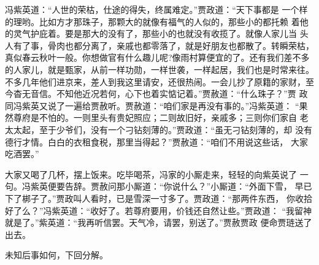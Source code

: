 冯紫英道：“人世的荣枯，仕途的得失，终属难定。”贾政道：“天下事都是
一个样的理哟。比如方才那珠子，那颗大的就像有福气的人似的，那些小的都托赖
着他的灵气护庇着。要是那大的没有了，那些小的也就没有收揽了。就像人家儿当
头人有了事，骨肉也都分离了，亲戚也都零落了，就是好朋友也都散了。转瞬荣枯，
真似春云秋叶一般。你想做官有什么趣儿呢?像雨村算便宜的了。还有我们差不多
的人家儿，就是甄家，从前一样功勋，一样世袭，一样起居，我们也是时常来往。
不多几年他们进京来，差人到我这里请安，还很热闹。一会儿抄了原籍的家财，至
今杳无音信。不知他近况若何，心下也着实惦记着。”贾赦道：“什么珠子？”贾
政同冯紫英又说了一遍给贾赦听。贾赦道：“咱们家是再没有事的。”冯紫英道：
“果然尊府是不怕的。一则里头有贵妃照应；二则故旧好，亲戚多；三则你们家自
老太太起，至于少爷们，没有一个刁钻刻薄的。”贾政道：“虽无刁钻刻薄的，却
没有德行才情。白白的衣租食税，那里当得起？”贾赦道：“咱们不用说这些话，
大家吃酒罢。”

大家又喝了几杯，摆上饭来。吃毕喝茶，冯家的小厮走来，轻轻的向紫英说了
一句。冯紫英便要告辞。贾赦问那小厮道：“你说什么？”小厮道：“外面下雪，
早已下了梆子了。”贾政叫人看时，已是雪深一寸多了。贾政道：“那两件东西，
你收拾好了么？”冯紫英道：“收好了。若尊府要用，价钱还自然让些。”贾政道：
“我留神就是了。”紫英道：“我再听信罢。天气冷，请罢，别送了。”贾赦贾政
便命贾琏送了出去。

未知后事如何，下回分解。